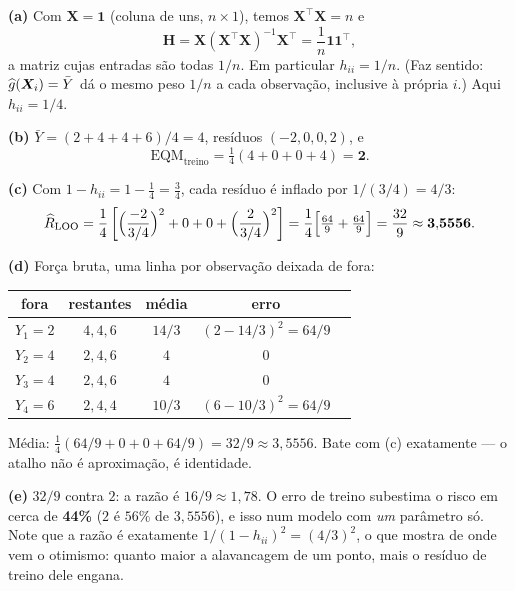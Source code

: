 \documentclass[11pt,a4paper]{article}
\begin{document}
\begin{solucao}
\textbf{(a)} Com $\bm X=\bm 1$ (coluna de uns, $n\times 1$), temos
$\bm X^\top\bm X=n$ e
\[
  \bm H=\bm X(\bm X^\top\bm X)^{-1}\bm X^\top=\frac1n\bm 1\bm 1^\top ,
\]
a matriz cujas entradas são todas $1/n$. Em particular $h_{ii}=1/n$. (Faz
sentido: $\widehat g(\bm{X}_i)=\bar Y$ dá o mesmo peso $1/n$ a cada observação,
inclusive à própria $i$.) Aqui $h_{ii}=1/4$.

\smallskip
\textbf{(b)} $\bar Y=(2+4+4+6)/4=4$, resíduos $(-2,0,0,2)$, e
\[
  \mathrm{EQM}_{\text{treino}}=\tfrac14(4+0+0+4)=\mathbf{2}.
\]

\smallskip
\textbf{(c)} Com $1-h_{ii}=1-\tfrac14=\tfrac34$, cada resíduo é inflado por
$1/(3/4)=4/3$:
\[
  \widehat{R}_{\text{LOO}}
  =\frac14\left[\Big(\frac{-2}{3/4}\Big)^2+0+0+\Big(\frac{2}{3/4}\Big)^2\right]
  =\frac14\Big[\tfrac{64}{9}+\tfrac{64}{9}\Big]
  =\frac{32}{9}\approx \mathbf{3{,}5556}.
\]

\smallskip
\textbf{(d)} Força bruta, uma linha por observação deixada de fora:
\begin{center}\small
\begin{tabular}{@{}ccccc@{}}
\toprule
fora & restantes & média & erro & \\
\midrule
$Y_1=2$ & $4,4,6$ & $14/3$ & $(2-14/3)^2=64/9$ & \\
$Y_2=4$ & $2,4,6$ & $4$    & $0$ & \\
$Y_3=4$ & $2,4,6$ & $4$    & $0$ & \\
$Y_4=6$ & $2,4,4$ & $10/3$ & $(6-10/3)^2=64/9$ & \\
\bottomrule
\end{tabular}
\end{center}
Média: $\tfrac14(64/9+0+0+64/9)=32/9\approx 3{,}5556$. Bate com (c) exatamente ---
o atalho não é aproximação, é identidade.

\smallskip
\textbf{(e)} $32/9$ contra $2$: a razão é $16/9\approx 1{,}78$. O erro de treino
subestima o risco em cerca de \textbf{44\%} ($2$ é $56\%$ de $3{,}5556$), e isso
num modelo com \emph{um} parâmetro só. Note que a razão é exatamente
$1/(1-h_{ii})^2=(4/3)^2$, o que mostra de onde vem o otimismo: quanto maior a
alavancagem de um ponto, mais o resíduo de treino dele engana.
\end{solucao}
\end{document}
